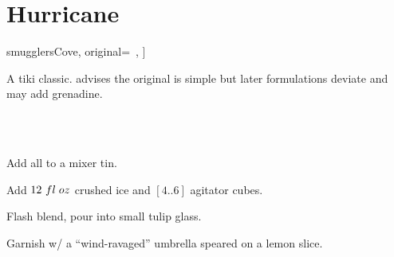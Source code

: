 \section[Hurricane]{Hurricane}


\begin{recipestats}[
	servings=1,
	preptime=5~\minute,
	source=\citeauthor{smugglersCove}~\cite[p.~68]{smugglersCove},
	original=\citeauthor{beachbumBerryRemixed}~\cite{beachbumBerryRemixed},
]
\end{recipestats}


\begin{recipeabstract}
	A tiki classic.
	\citeauthor{smugglersCove} advises the original is simple but later formulations deviate and may add grenadine.
\end{recipeabstract}


\begin{ingredientcolumns}[1]
	\begin{ingredientblock}
		\\
		\\
	\end{ingredientblock}
\end{ingredientcolumns}


\begin{preparation}
	\item Add all to a mixer tin.
	\item Add $12~fl\;oz$ crushed ice and $[4..6]$ agitator cubes.
	\item Flash blend, pour into small tulip glass.
	\item Garnish w/ a ``wind-ravaged'' umbrella speared on a lemon slice.
\end{preparation}


\recipeend%

